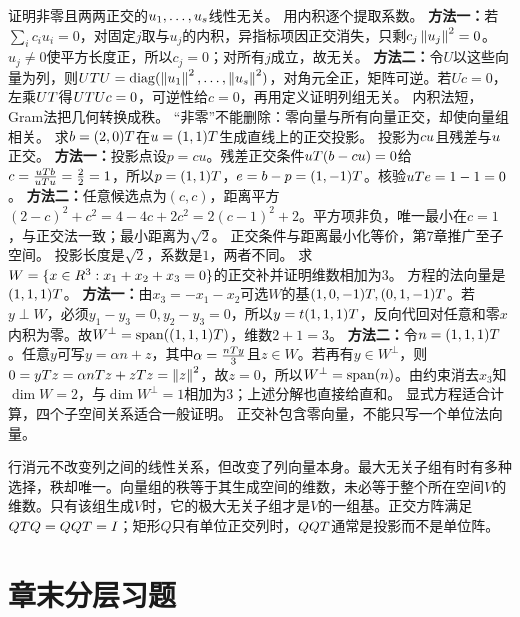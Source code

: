 {证明非零且两两正交的$u_1,\ldots,u_s$线性无关。}
{用内积逐个提取系数。}
{\textbf{方法一：}若$\sum_i c_iu_i=0$，对固定$j$取与$u_j$的内积，异指标项因正交消失，只剩$c_j\left\lVert u_j\right\rVert^2=0$。$u_j\ne0$使平方长度正，所以$c_j=0$；对所有$j$成立，故无关。
\textbf{方法二：}令$U$以这些向量为列，则$UT U=\operatorname{diag}(\left\lVert u_1\right\rVert^2,\ldots,\left\lVert u_s\right\rVert^2)$，对角元全正，矩阵可逆。若$Uc=0$，左乘$UT$得$UT Uc=0$，可逆性给$c=0$，再用定义证明列组无关。}
{内积法短，Gram法把几何转换成秩。}
{“非零”不能删除：零向量与所有向量正交，却使向量组相关。}
{求$b=(2,0)T$在$u=(1,1)T$生成直线上的正交投影。}
{投影为$cu$且残差与$u$正交。}
{\textbf{方法一：}投影点设$p=cu$。残差正交条件$uT(b-cu)=0$给$c=\frac{uT b}{uT u}=\frac{2}{2}=1$，所以$p=(1,1)T$，$e=b-p=(1,-1)T$。核验$uT e=1-1=0$。
\textbf{方法二：}任意候选点为$(c,c)$，距离平方$(2-c)^2+c^2=4-4c+2c^2=2(c-1)^2+2$。平方项非负，唯一最小在$c=1$，与正交法一致；最小距离为$\sqrt2$。}
{正交条件与距离最小化等价，第7章推广至子空间。}
{投影长度是$\sqrt2$，系数是$1$，两者不同。}
{求$W=\{x\in R^3:x_1+x_2+x_3=0\}$的正交补并证明维数相加为3。}
{方程的法向量是$(1,1,1)T$。}
{\textbf{方法一：}由$x_3=-x_1-x_2$可选$W$的基$(1,0,-1)T,(0,1,-1)T$。若$y\perp W$，必须$y_1-y_3=0,y_2-y_3=0$，所以$y=t(1,1,1)T$，反向代回对任意和零$x$内积为零。故$W^\perp=\operatorname{span}((1,1,1)T)$，维数$2+1=3$。
\textbf{方法二：}令$n=(1,1,1)T$。任意$y$可写$y=\alpha n+z$，其中$\alpha=\frac{nT y}{3}$且$z\in W$。若再有$y\in W^\perp$，则$0=yT z=\alpha nT z+zT z=\left\lVert z\right\rVert^2$，故$z=0$，所以$W^\perp=\operatorname{span}(n)$。由约束消去$x_3$知$\dim W=2$，与$\dim W^\perp=1$相加为3；上述分解也直接给直和。}
{显式方程适合计算，四个子空间关系适合一般证明。}
{正交补包含零向量，不能只写一个单位法向量。}


\begin{warning}
行消元不改变列之间的线性关系，但改变了列向量本身。最大无关子组有时有多种选择，秩却唯一。向量组的秩等于其生成空间的维数，未必等于整个所在空间$V$的维数。只有该组生成$V$时，它的极大无关子组才是$V$的一组基。正交方阵满足$QT Q=QQT=I$；矩形$Q$只有单位正交列时，$QQT$通常是投影而不是单位阵。
\end{warning}
\section*{章末分层习题}
